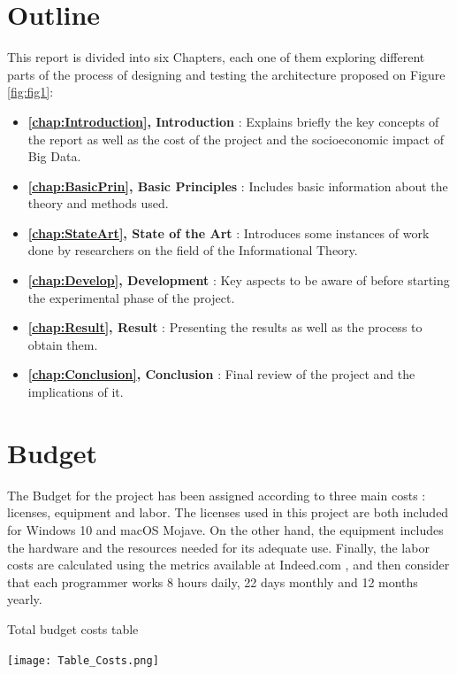
\section{Outline}

This report is divided into six Chapters, each one of them exploring different parts of the process of designing and testing the architecture proposed on Figure \ref{fig:fig1}:

\begin{itemize}
	\item \textbf{ \autoref{chap:Introduction}, Introduction} : Explains briefly the key concepts of the report as well as the cost of the project and the socioeconomic impact of Big Data.
	
	\item \textbf{ \autoref{chap:BasicPrin}, Basic Principles} : Includes basic information about the theory and methods used.
	
	\item \textbf{ \autoref{chap:StateArt}, State of the Art} : Introduces some instances of work done by researchers on the field of the Informational Theory.

	\item \textbf{ \autoref{chap:Develop}, Development} : Key aspects to be aware of before starting the experimental phase of the project.
	
	\item \textbf{ \autoref{chap:Result}, Result} : Presenting the results as well as the process to obtain them.
	
	\item \textbf{ \autoref{chap:Conclusion}, Conclusion} : Final review of the project and the implications of it.
	
\end{itemize}

\section{Budget}

The Budget for the project has been assigned according to three main costs : licenses, equipment and labor. The licenses used in this project are both included for Windows 10 and macOS Mojave. On the other hand, the equipment includes the hardware and the resources needed for its adequate use. Finally, the labor costs are calculated using the metrics available at Indeed.com \cite{ProgrammerSalaries}, and then consider that each programmer works 8 hours daily, 22 days monthly and 12 months yearly. \par
\begin{table}[H]
	\caption{Total budget costs table}
	\label{tbl:budget_table}
    \texttt{[image: Table\_Costs.png]}
\end{table}

